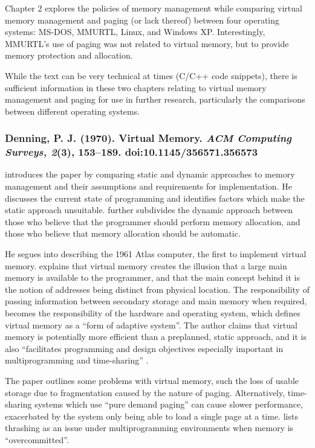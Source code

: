 Chapter 2 explores the policies of memory management while comparing virtual memory management and paging (or lack thereof) between four operating systems: MS-DOS, MMURTL, Linux, and Windows XP. Interestingly, MMURTL's use of paging was not related to virtual memory, but to provide memory protection and allocation.

While the text can be very technical at times (C/C++ code snippets), there is sufficient information in these two chapters relating to virtual memory management and paging for use in further research, particularly the comparisons between different operating systems.

\newpage

\subsubsection*{Denning, P. J. (1970). Virtual Memory. \emph{ACM Computing Surveys, 2}(3), 153–189. doi:10.1145/356571.356573}

\citet{Denning1970} introduces the paper by comparing static and dynamic approaches to memory management and their assumptions and requirements for implementation. He discusses the current state of programming and identifies factors which make the static approach unsuitable. \citet{Denning1970} further subdivides the dynamic approach between those who believe that the programmer should perform memory allocation, and those who believe that memory allocation should be automatic.

He segues into describing the 1961 Atlas computer, the first to implement virtual memory. \citet{Denning1970} explains that virtual memory creates the illusion that a large main memory is available to the programmer, and that the main concept behind it is the notion of addresses being distinct from physical location. The responsibility of passing information between secondary storage and main memory when required, becomes the responsibility of the hardware and operating system, which defines virtual memory as a ``form of adaptive system''. The author claims that virtual memory is potentially more efficient than a preplanned, static approach, and it is also ``facilitates programming and design objectives especially important in multiprogramming and time-sharing'' \citep[p. 156]{Denning1970}.

The paper outlines some problems with virtual memory, such the loss of usable storage due to fragmentation caused by the nature of paging. Alternatively, time-sharing systems which use ``pure demand paging'' can cause slower performance, exacerbated by the system only being able to load a single page at a time. \citet[p. 157]{Denning1970} lists thrashing as an issue under multiprogramming environments when memory is ``overcommitted''.

